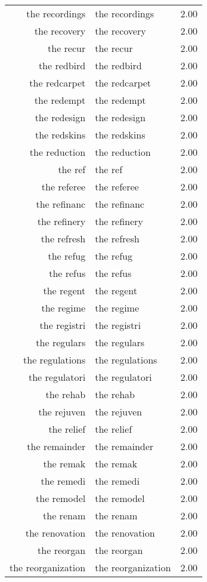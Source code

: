 \begin{table}[ht]
\begin{tabular}{rlr}
  the recordings & the recordings & 2.00 \\ 
  the recovery & the recovery & 2.00 \\ 
  the recur & the recur & 2.00 \\ 
  the redbird & the redbird & 2.00 \\ 
  the redcarpet & the redcarpet & 2.00 \\ 
  the redempt & the redempt & 2.00 \\ 
  the redesign & the redesign & 2.00 \\ 
  the redskins & the redskins & 2.00 \\ 
  the reduction & the reduction & 2.00 \\ 
  the ref & the ref & 2.00 \\ 
  the referee & the referee & 2.00 \\ 
  the refinanc & the refinanc & 2.00 \\ 
  the refinery & the refinery & 2.00 \\ 
  the refresh & the refresh & 2.00 \\ 
  the refug & the refug & 2.00 \\ 
  the refus & the refus & 2.00 \\ 
  the regent & the regent & 2.00 \\ 
  the regime & the regime & 2.00 \\ 
  the registri & the registri & 2.00 \\ 
  the regulars & the regulars & 2.00 \\ 
  the regulations & the regulations & 2.00 \\ 
  the regulatori & the regulatori & 2.00 \\ 
  the rehab & the rehab & 2.00 \\ 
  the rejuven & the rejuven & 2.00 \\ 
  the relief & the relief & 2.00 \\ 
  the remainder & the remainder & 2.00 \\ 
  the remak & the remak & 2.00 \\ 
  the remedi & the remedi & 2.00 \\ 
  the remodel & the remodel & 2.00 \\ 
  the renam & the renam & 2.00 \\ 
  the renovation & the renovation & 2.00 \\ 
  the reorgan & the reorgan & 2.00 \\ 
  the reorganization & the reorganization & 2.00 \\ 

\end{tabular}
\end{table}
